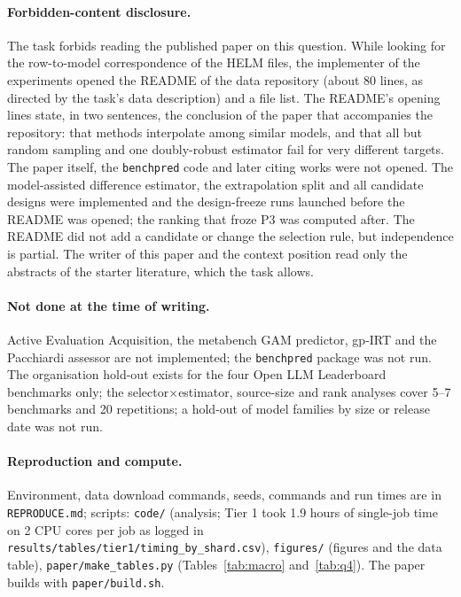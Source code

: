 \paragraph{Forbidden-content disclosure.}
The task forbids reading the published paper on this question. While looking for the row-to-model correspondence of the HELM files, the implementer of the experiments opened the README of the data repository (about 80 lines, as directed by the task's data description) and a file list. The README's opening lines state, in two sentences, the conclusion of the paper that accompanies the repository: that methods interpolate among similar models, and that all but random sampling and one doubly-robust estimator fail for very different targets. The paper itself, the \texttt{benchpred} code and later citing works were not opened. The model-assisted difference estimator, the extrapolation split and all candidate designs were implemented and the design-freeze runs launched before the README was opened; the ranking that froze P3 was computed after. The README did not add a candidate or change the selection rule, but independence is partial. The writer of this paper and the context position read only the abstracts of the starter literature, which the task allows.

\paragraph{Not done at the time of writing.}
Active Evaluation Acquisition, the metabench GAM predictor, gp-IRT and the Pacchiardi assessor are not implemented; the \texttt{benchpred} package was not run. The organisation hold-out exists for the four Open LLM Leaderboard benchmarks only; the selector$\times$estimator, source-size and rank analyses cover 5--7 benchmarks and 20 repetitions; a hold-out of model families by size or release date was not run.

\paragraph{Reproduction and compute.}
Environment, data download commands, seeds, commands and run times are in \texttt{REPRODUCE.md}; scripts: \texttt{code/} (analysis; Tier 1 took 1.9 hours of single-job time on 2 CPU cores per job as logged in \texttt{results/tables/tier1/timing\_by\_shard.csv}), \texttt{figures/} (figures and the data table), \texttt{paper/make\_tables.py} (Tables~\ref{tab:macro} and~\ref{tab:q4}). The paper builds with \texttt{paper/build.sh}.
